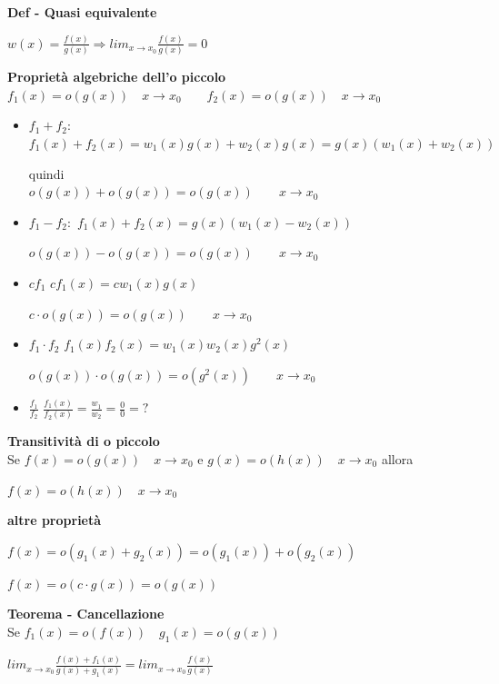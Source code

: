 \documentclass[12pt, a4paper]{article}
\begin{document}
    \textbf{Def - Quasi equivalente}\\
    \begin{center}
        $w(x)=\frac{f(x)}{g(x)}\Rightarrow lim_{x\to x_{0}}\frac{f(x)}{g(x)}=0$
    \end{center}

    \textbf{Proprietà algebriche dell'o piccolo}\\
$f_{1}(x)=o(g(x))\quad x\to x_{0}\qquad f_{2}(x)=o(g(x))\quad x\to x_{0}$

    \begin{itemize}
        \item $f_{1}+f_{2}:$
              \subitem $f_{1}(x)+f_{2}(x)=w_{1}(x)g(x)+w_{2}(x)g(x)=g(x)(w_{1}(x)+w_{2}(x))$

              quindi\\
              $o(g(x))+o(g(x))=o(g(x))\qquad x\to x_{0}$
        \item $f_{1}-f_{2}:$
              \subitem $f_{1}(x)+f_{2}(x)=g(x)(w_{1}(x)-w_{2}(x))$

              $o(g(x))-o(g(x))=o(g(x))\qquad x\to x_{0}$
        \item $cf_{1}$
              \subitem $cf_{1}(x)=cw_{1}(x)g(x)$

              $c\cdot o(g(x))=o(g(x))\qquad x\to x_{0}$
        \item $f_{1}\cdot f_{2}$
              \subitem $f_{1}(x)f_{2}(x)=w_{1}(x)w_{2}(x)g^{2}(x)$

              $o(g(x))\cdot o(g(x))=o(g^{2}(x))\qquad x\to x_{0}$
        \item $\frac{f_{1}}{f_{2}}$
              \subitem $\frac{f_{1}(x)}{f_{2}(x)}=\frac{w_{1}}{w_{2}}=\frac{0}{0}=?$

    \end{itemize}

    \textbf{Transitività di o piccolo}\\Se $f(x)=o(g(x))\quad x\to x_{0}$ e $g(x)=o(h(x))\quad x\to x_{0}$ allora
    \begin{center}
        $f(x)=o(h(x))\quad x\to x_{0}$
    \end{center}
    \textbf{altre proprietà}

$f(x)=o(g_{1}(x)+g_{2}(x))=o(g_{1}(x))+o(g_{2}(x))$

$f(x)=o(c\cdot g(x))=o(g(x))$

    \textbf{Teorema - Cancellazione}\\Se $f_{1}(x)=o(f(x))\quad g_{1}(x)=o(g(x))$
    \begin{center}
        $lim_{x\to x_{0}}\frac{f(x)+f_{1}(x)}{g(x)+g_{1}(x)}=lim_{x\to x_{0}}\frac{f(x)}{g(x)}$
    \end{center}
\end{document}
